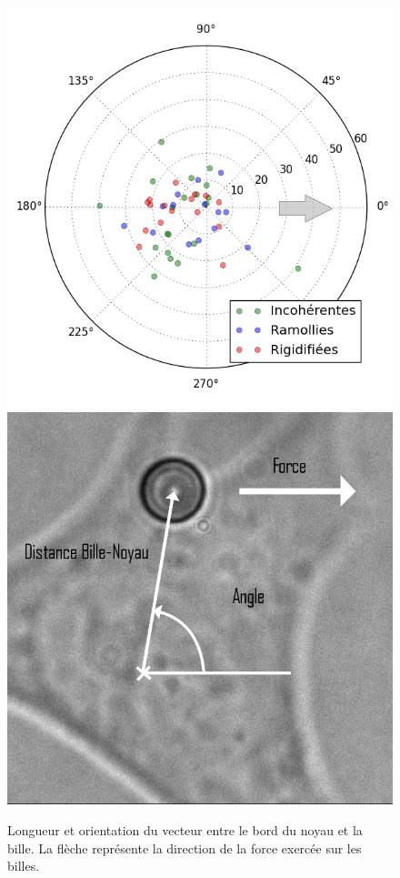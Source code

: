 \begin{figure}
\includegraphics[scale=0.45]{Figures/Positions_FRI.png} 
\includegraphics[scale=0.2]{Figures/Schema_angle.png}
\caption{Longueur et orientation du vecteur entre le bord du noyau et la bille. La flèche représente la direction de la force exercée sur les billes.\label{polar}}
\end{figure}
